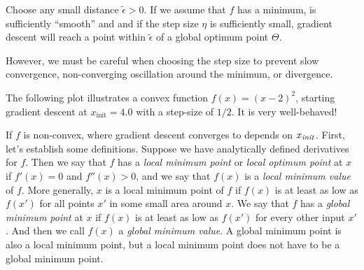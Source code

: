 \begin{theorem}
  Choose any small distance $\tilde{\epsilon} > 0$.
  If we assume that $f$ has a minimum, is sufficiently ``smooth'' and 
  and if the step size $\eta$ is sufficiently small, gradient descent will reach a point within $\tilde{\epsilon}$ of a global optimum point $\Theta$.

\end{theorem}
However, we must be careful when choosing the step size to prevent
slow convergence, non-converging oscillation around the minimum, or divergence.

The following plot illustrates a convex function $f(x) = (x - 2)^2$,
starting gradient descent at $x_\textrm{init} = 4.0$ with a step-size of
$1/2$.  It is very well-behaved!

\begin{center}
\end{center}


If $f$ is non-convex, where gradient descent converges to depends on
$x_{\it init}$.  First, let's establish some
definitions. Suppose we have analytically defined derivatives for $f$.
Then we say that $f$ has a {\em local minimum point} or {\em local optimum point}
at $x$ if
$f'(x) = 0$ and $f''(x)
  > 0$, and we say that $f(x)$ is a {\em local minimum value} of $f$.
More generally, $x$ is a local minimum point of $f$ if $f(x)$ is at
least as low as $f(x')$ for all points $x'$ in some small area around $x$.
We say that $f$ has a {\em global
    minimum point} at $x$ if $f(x)$ is at least as low as $f(x')$ for every other input $x'$.
And then we call $f(x)$ a {\em global minimum value}.
A global minimum point is also a local minimum point, but a local
minimum point does not have to be a global minimum point.

